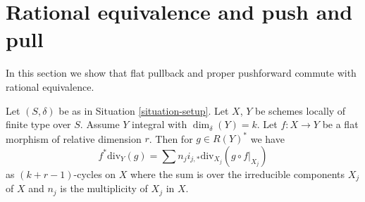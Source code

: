 \section{Rational equivalence and push and pull}
\label{section-properties-rational-equivalence}

\noindent
In this section we show that flat pullback and proper pushforward
commute with rational equivalence.

\begin{lemma}
\label{lemma-prepare-flat-pullback-rational-equivalence}
Let $(S, \delta)$ be as in Situation \ref{situation-setup}.
Let $X$, $Y$ be schemes locally of finite type over $S$.
Assume $Y$ integral with $\dim_\delta(Y) = k$.
Let $f : X \to Y$ be a flat morphism of
relative dimension $r$. Then for $g \in R(Y)^*$ we have
$$
f^*\text{div}_Y(g) =
\sum n_j i_{j, *}\text{div}_{X_j}(g \circ f|_{X_j})
$$
as $(k + r - 1)$-cycles on $X$ where the sum is over the irreducible
components $X_j$ of $X$ and $n_j$ is the multiplicity of $X_j$ in $X$.
\end{lemma}

